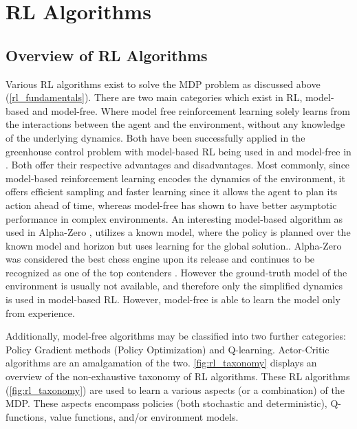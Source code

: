 \chapter{RL Algorithms}
\section{Overview of RL Algorithms}\label{section:RL aglorithms overview}
Various RL algorithms exist to solve the MDP problem as discussed above (\autoref{rl_fundamentals}). There are two main categories which exist in RL, model-based and model-free. Where model free reinforcement learning solely learns from the interactions between the agent and the environment, without any knowledge of the underlying dynamics. Both have been successfully applied in the greenhouse control problem with model-based RL being used in \cite{zhangRobustModelbasedReinforcement2021,} and model-free in \cite{jansenOptimalControlLettuce2023,ajagekarDeepReinforcementLearning2022,vandenbemdRobustDeepReinforcement,hemmingRemoteControlGreenhouse2019}. Both offer their respective advantages and disadvantages. Most commonly, since model-based reinforcement learning encodes the dynamics of the environment, it offers efficient sampling and faster learning since it allows the agent to plan its action ahead of time, whereas model-free has shown to have better asymptotic performance in complex environments. An interesting model-based algorithm as used in Alpha-Zero \cite{silverGeneralReinforcementLearning2018}, 
utilizes a known model, where the policy is planned over the known model and horizon but uses learning for the global solution.\cite{jonkerModelbasedReinforcementLearning}. Alpha-Zero was considered the best chess engine upon its release and continues to be recognized as one of the top contenders \cite{silverGeneralReinforcementLearning2018}. However the ground-truth model of the environment is usually not available, and therefore only the simplified dynamics is used in model-based RL. However, model-free is able to learn the model only from experience. 

Additionally, model-free algorithms may be classified into two further categories: Policy Gradient methods (Policy Optimization) and Q-learning. Actor-Critic algorithms are an amalgamation of the two. \autoref{fig:rl_taxonomy} displays an overview of the non-exhaustive taxonomy of RL algorithms. These RL algorithms (\autoref{fig:rl_taxonomy}) are used to  learn a various aspects (or a combination) of the MDP. These aspects encompass policies (both stochastic and deterministic), Q-functions, value functions, and/or environment models.

